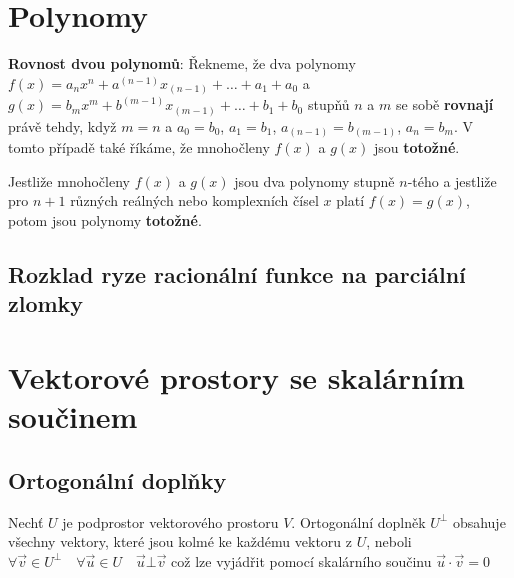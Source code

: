   \section{Polynomy}
      \begin{definition}\label{def_rov_poly}\textbf{Rovnost dvou polynomů}:
        Řekneme, že dva polynomy \(f(x)=a_nx^n+a^{(n-1)}x_{(n-1)}+\ldots+a_1+a_0\) a
        \(g(x)=b_mx^m+b^{(m-1)}x_{(m-1)}+\ldots+b_1+b_0\) stupňů \(n\) a \(m\) se sobě 
        \textbf{rovnají} právě tehdy, když \(m=n\) a \(a_0=b_0\), \(a_1=b_1\), 
        \(a_{(n-1)}=b_{(m-1)}\), \(a_n=b_m\). V tomto případě také říkáme, že mnohočleny \(f(x)\) a 
        \(g(x)\) jsou \textbf{totožné}.
      \end{definition}
      \begin{lemma}\label{la:eq_eqv_poly}
        Jestliže mnohočleny \(f(x)\) a \(g(x)\) jsou dva polynomy stupně \(n\)-tého a jestliže pro 
        \(n+1\) různých reálných nebo komplexních čísel \(x\) platí \(f(x)=g(x)\), potom jsou 
        polynomy \textbf{totožné}.
      \end{lemma}
      
    \subsection{Rozklad ryze racionální funkce na parci\-ální zlomky}

       
      
  \section{Vektorové prostory se skalárním součinem}
    \subsection{Ortogonální doplňky}
      Nechť \(U\) je podprostor vektorového prostoru \(V\). Ortogonální doplněk $U^\bot$ obsahuje 
      všechny vektory, které jsou kolmé ke každému vektoru z \(U\), neboli \(\forall\vec{v}\in 
      U^\bot\quad \forall\vec{u}\in U\quad \vec{u}\bot\vec{v}\) což lze vyjádřit pomocí skalárního 
      součinu \(\vec{u}\cdot\vec{v} = 0\)
  
